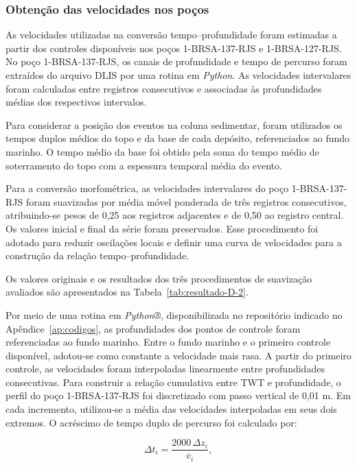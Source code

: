 \subsubsection{Obtenção das velocidades nos poços}\label{sec:4-3-8-1}

As velocidades utilizadas na conversão tempo--profundidade foram estimadas a partir dos controles disponíveis nos poços 1-BRSA-137-RJS e 1-BRSA-127-RJS. No poço 1-BRSA-137-RJS, os canais de profundidade e tempo de percurso foram extraídos do arquivo DLIS por uma rotina em \textit{Python}. As velocidades intervalares foram calculadas entre registros consecutivos e associadas às profundidades médias dos respectivos intervalos.

Para considerar a posição dos eventos na coluna sedimentar, foram utilizados os tempos duplos médios do topo e da base de cada depósito, referenciados ao fundo marinho. O tempo médio da base foi obtido pela soma do tempo médio de soterramento do topo com a espessura temporal média do evento.

Para a conversão morfométrica, as velocidades intervalares do poço 1-BRSA-137-RJS foram suavizadas por média móvel ponderada de três registros consecutivos, atribuindo-se pesos de 0,25 aos registros adjacentes e de 0,50 ao registro central. Os valores inicial e final da série foram preservados. Esse procedimento foi adotado para reduzir oscilações locais e definir uma curva de velocidades para a construção da relação tempo--profundidade.

Os valores originais e os resultados dos três procedimentos de suavização avaliados são apresentados na Tabela~\ref{tab:resultado-D-2}.

Por meio de uma rotina em \textit{Python®}, disponibilizada no repositório indicado no Apêndice~\ref{ap:codigos}, as profundidades dos pontos de controle foram referenciadas ao fundo marinho. Entre o fundo marinho e o primeiro controle disponível, adotou-se como constante a velocidade mais rasa. A partir do primeiro controle, as velocidades foram interpoladas linearmente entre profundidades consecutivas. Para construir a relação cumulativa entre TWT e profundidade, o perfil do poço 1-BRSA-137-RJS foi discretizado com passo vertical de 0,01 m. Em cada incremento, utilizou-se a média das velocidades interpoladas em seus dois extremos. O acréscimo de tempo duplo de percurso foi calculado por:

\begin{equation}
  \Delta t_i=\frac{2000\,\Delta z_i}{\overline{v}_i},
  \label{eq:acrescimo-twt}
\end{equation}

